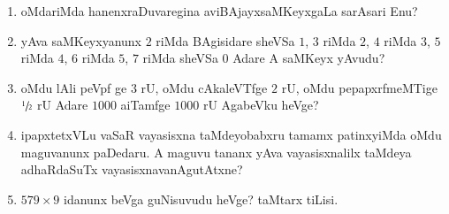 \begin{enumerate}
\item oMdariMda hanenxraDuvaregina aviBAjayxsaMKeyxgaLa sarAsari Enu?

\item yAva saMKeyxyanunx $2$ riMda BAgisidare sheVSa $1$, $3$ riMda $2$, $4$ riMda $3$, $5$ riMda $4$, $6$ riMda $5$, $7$ riMda sheVSa $0$ Adare A saMKeyx yAvudu?

\item oMdu lAli peVpf ge $3$ rU, oMdu cAkaleVTfge $2$ rU, oMdu pepapxrfmeMTige $\sfrac{1}{2}$ rU Adare $1000$ aiTamfge $1000$ rU AgabeVku heVge?

\item ipapxtetxVLu vaSaR vayasisxna taMdeyobabxru tamamx patinxyiMda oMdu maguvanunx paDedaru. A maguvu tananx yAva vayasisxnalilx taMdeya adhaRdaSuTx vayasisxnavanAgutAtxne?

\item $579\times 9$ idanunx beVga guNisuvudu heVge? taMtarx tiLisi.
\end{enumerate}

